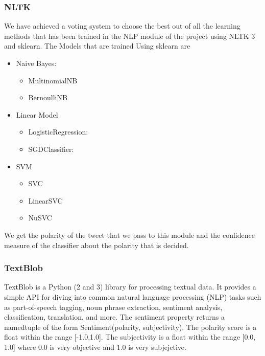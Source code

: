 \documentclass[a4paper]{article}
\begin{document}
\subsubsection{NLTK}
We have achieved a voting system to choose the best out of all the learning methods that has been trained in the NLP module of the project using NLTK 3 and sklearn. The Models that are trained Using sklearn are 
\begin{itemize}
\item  Naive Bayes:
\begin{itemize}
\item MultinomialNB
\item BernoulliNB
\end{itemize} 
\item Linear Model
\begin{itemize}
\item LogisticRegression:
\item  SGDClassifier:
\end{itemize} 
\item SVM
\begin{itemize}
\item  SVC
\item LinearSVC
\item NuSVC
\end{itemize}
\end{itemize}
We get the polarity of the tweet that we pass to this module and the confidence measure of the classifier about the polarity that is decided. 

\subsubsection{TextBlob}
TextBlob is a Python (2 and 3) library for processing textual data. It provides a simple API for diving into common natural language processing (NLP) tasks such as part-of-speech tagging, noun phrase extraction, sentiment analysis, classification, translation, and more. 
The sentiment property returns a namedtuple of the form Sentiment(polarity, subjectivity). The polarity score is a float within the range [-1.0,1.0]. The subjectivity is a float within the range [0.0, 1.0] where 0.0 is very objective and 1.0 is very subjejctive.
\end{document}

